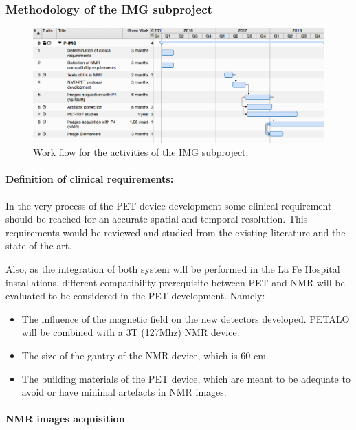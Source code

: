 \subsubsection*{Methodology of the IMG subproject}


\begin{figure}[!htb]
	\centering
	\includegraphics[scale=0.5]{img/ImgWF.png}
	\caption{\label{fig.ImgWF} Work flow for the activities of the IMG subproject.  }
\end{figure}

\paragraph{Definition of clinical requirements:}

In the very process of the PET device development some clinical requirement should be reached for an accurate spatial and temporal resolution. This requirements would be reviewed and studied from the existing literature and the state of the art.

Also, as the integration of both system will be performed in the La Fe Hospital installations, different compatibility prerequisite between PET and NMR will be evaluated to be considered in the PET development. Namely:
\begin{itemize}
\item The influence of the magnetic field on the new detectors developed. PETALO will be combined with a 3T (127Mhz) NMR device.
\item The size of the gantry of the NMR device, which is 60 cm.
\item The building materials of the PET device, which are meant to be adequate to avoid or have minimal artefacts in NMR images. 
\end{itemize}

\paragraph{NMR images acquisition}

